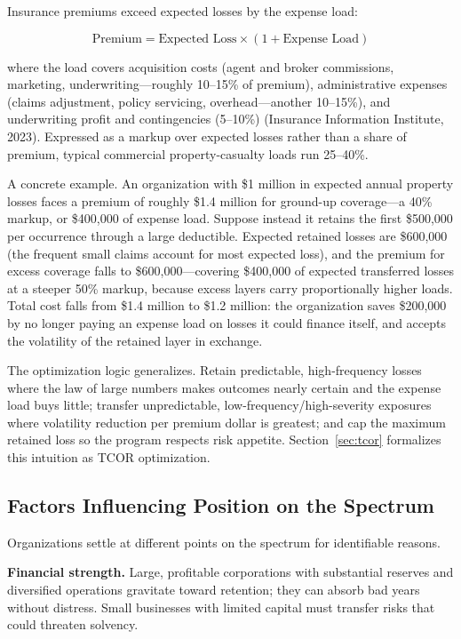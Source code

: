 \documentclass[11pt,openany]{book}
\begin{document}
Insurance premiums exceed expected losses by the expense load:

\[
\text{Premium} = \text{Expected Loss} \times (1 + \text{Expense Load})
\]

where the load covers acquisition costs (agent and broker commissions,
marketing, underwriting---roughly 10--15\% of premium), administrative
expenses (claims adjustment, policy servicing, overhead---another 10--15\%),
and underwriting profit and contingencies (5--10\%) (Insurance Information
Institute, 2023). Expressed as a markup over expected losses rather than a
share of premium, typical commercial property-casualty loads run 25--40\%.

A concrete example. An organization with \$1 million in expected annual
property losses faces a premium of roughly \$1.4 million for ground-up
coverage---a 40\% markup, or \$400,000 of expense load. Suppose instead it
retains the first \$500,000 per occurrence through a large deductible.
Expected retained losses are \$600,000 (the frequent small claims account for
most expected loss), and the premium for excess coverage falls to
\$600,000---covering \$400,000 of expected transferred losses at a steeper
50\% markup, because excess layers carry proportionally higher loads. Total
cost falls from \$1.4 million to \$1.2 million: the organization saves
\$200,000 by no longer paying an expense load on losses it could finance
itself, and accepts the volatility of the retained layer in exchange.

The optimization logic generalizes. Retain predictable, high-frequency losses
where the law of large numbers makes outcomes nearly certain and the expense
load buys little; transfer unpredictable, low-frequency/high-severity
exposures where volatility reduction per premium dollar is greatest; and cap
the maximum retained loss so the program respects risk appetite.
Section~\ref{sec:tcor} formalizes this intuition as TCOR optimization.

\subsection{Factors Influencing Position on the Spectrum}

Organizations settle at different points on the spectrum for identifiable
reasons.

\textbf{Financial strength.} Large, profitable corporations with substantial
reserves and diversified operations gravitate toward retention; they can
absorb bad years without distress. Small businesses with limited capital must
transfer risks that could threaten solvency.
\end{document}
